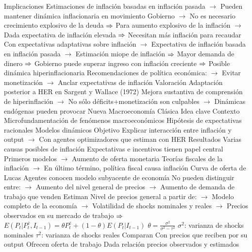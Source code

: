 \documentclass{nuevotema}
\begin{document}
\begin{esquemal}
				\4 Implicaciones
				\4[] Estimaciones de inflación basadas en inflación pasada
				\4[] $\to$ Pueden mantener dinámica inflacionaria en movimiento
				\4[] Gobierno
				\4[] $\to$ No es necesario crecimiento explosivo de la deuda
				\4[] $\Rightarrow$ Para aumento explosivo de la inflación
				\4[] $\to$ Dada expectativa de inflación elevada
				\4[] $\Rightarrow$ Necesitan más inflación para recaudar
				\4[] Con expectativas adaptativas sobre inflación
				\4[] $\to$ Expectativa de inflación basada en inflación pasada
				\4[] $\to$ Estimación miope de inflación
				\4[] $\Rightarrow$ Mayor demanda de dinero
				\4[] $\Rightarrow$ Gobierno puede superar ingreso con inflación creciente
				\4[] $\Rightarrow$ Posible dinámica hiperinflacionaria
				\4[] Recomendaciones de política económica:
				\4[] $\to$ Evitar monetización
				\4[] $\to$ Anclar expectativas de inflación
				\4 Valoración
				\4[] Adaptación posterior a HER en Sargent y Wallace (1972)
				\4[] Mejora sustantiva de comprensión de hiperinflación
				\4[] $\to$ No sólo déficits+monetización son culpables
				\4[] $\to$ Dinámicas endógenas pueden provocar
		\2 Nueva Macroeconomía Clásica
			\3 Idea clave
				\4 Contexto
				\4[] Microfundamentación de fenómenos macroeconómicos
				\4[] Hipótesis de expectativas racionales
				\4[] Modelos dinámicos
				\4 Objetivo
				\4[] Explicar interacción entre inflación y output
				\4[] $\to$ Con agentes optimizadores que estiman con HER
				\4 Resultados
				\4[] Varias causas posibles de inflación
				\4[] Expectativas e incentivos tienen papel central
				\4[] Primeros modelos
				\4[] $\to$ Aumento de oferta monetaria
				\4[] Teorías fiscales de la inflación
				\4[] $\to$ En último término, política fiscal causa inflación
			\3 Curva de oferta de Lucas
				\4 Agentes conocen modelo subyacente de economía
				\4 No pueden distinguir entre:
				\4[] $\to$ Aumento del nivel general de precios
				\4[] $\to$ Aumento de demanda de trabajo que venden
				\4 Estiman
				\4[] Nivel de precios general a partir de:
				\4[] $\to$ Modelo completo de la economía
				\4[] $\to$ Volatilidad de shocks nominales y reales
				\4[] $\to$ Precios observados en su mercado de trabajo
				\4[] $\Rightarrow$ $E(P_t | P^z_t, I_{t-1}) = \theta P^z_t + (1-\theta) E(P_t | I_{t-1})$
				\4[] \quad \quad $\theta=\frac{\sigma^2}{\sigma^2 - \tau^2}$
				\4[] \quad \quad $\sigma^2$: varianza de shocks nominales
				\4[] \quad \quad $\tau^2$: varianza de shocks reales
				\4 Comparan
				\4[] Con precios que reciben por su output
				\4 Ofrecen oferta de trabajo
				\4[] Dada relación precios observados y estimados

\end{esquemal}
\end{document}
